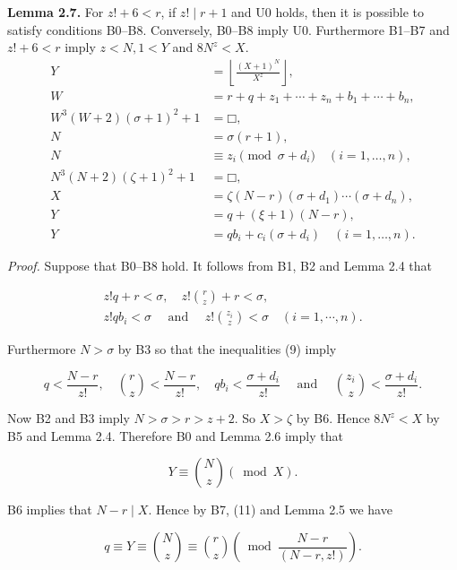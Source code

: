 \documentclass[11pt,a4paper]{article}
\newcommand{\origpage}[1]{\marginnote{\footnotesize\textbf{[#1]}}}
\newcommand{\square}{\mdlgwhtsquare}
\begin{document}
\par{}\medskip\noindent\textbf{Lemma 2.7.} For $z!+6<r$, if $z!\mid r+1$ and U0 holds, then it is possible to satisfy conditions B0--B8. Conversely, B0--B8 imply U0. Furthermore B1--B7 and $z!+6<r$ imply $z<N, 1<Y$ and $8 N^{z}<X$.
\begin{align*}
Y&=\left\lfloor\frac{(X+1)^N}{X^z}\right\rfloor, \tag{B0}\\
W&=r+q+z_1+\cdots+z_n+b_1+\cdots+b_n, \tag{B1}\\
W^3(W+2)(\sigma+1)^2+1&=\square, \tag{B2}\\
N&=\sigma(r+1), \tag{B3}\\
N&\equiv z_i\pmod{\sigma+d_i}\quad(i=1,\ldots,n), \tag{B4}\\
N^3(N+2)(\zeta+1)^2+1&=\square, \tag{B5}\\
X&=\zeta(N-r)(\sigma+d_1)\cdots(\sigma+d_n), \tag{B6}\\
Y&=q+(\xi+1)(N-r), \tag{B7}\\
Y&=qb_i+c_i(\sigma+d_i)\quad(i=1,\ldots,n). \tag{B8}
\end{align*}

\noindent\textit{Proof.} \origpage{343}Suppose that B0--B8 hold. It follows from B1, B2 and Lemma 2.4 that


\begin{gather*}
z!q+r<\sigma, \quad z!\binom{r}{z}+r<\sigma, \\
z!q b_{i}<\sigma \quad \text { and } \quad z!\binom{z_{i}}{z}<\sigma \quad(i=1, \cdots, n) . \tag{9}
\end{gather*}


Furthermore $N>\sigma$ by B3 so that the inequalities (9) imply


\begin{equation*}
q<\frac{N-r}{z!}, \quad\binom{r}{z}<\frac{N-r}{z!}, \quad q b_{i}<\frac{\sigma+d_{i}}{z!} \quad \text { and } \quad\binom{z_{i}}{z}<\frac{\sigma+d_{i}}{z!} . \tag{10}
\end{equation*}


Now B2 and B3 imply $N>\sigma>r>z+2$. So $X>\zeta$ by B6. Hence $8 N^{z}<X$ by B5 and Lemma 2.4. Therefore B0 and Lemma 2.6 imply that


\begin{equation*}
Y \equiv\binom{N}{z}(\bmod X) . \tag{11}
\end{equation*}


B6 implies that $N-r \mid X$. Hence by B7, (11) and Lemma 2.5 we have

$$
q \equiv Y \equiv\binom{N}{z} \equiv\binom{r}{z}\left(\bmod \frac{N-r}{(N-r, z!)}\right) .
$$
\end{document}

